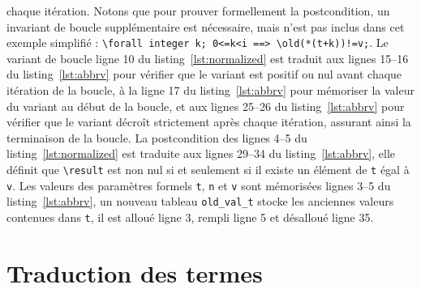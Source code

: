 chaque itération.
Notons que pour prouver formellement la postcondition, un invariant de boucle
supplémentaire est nécessaire, mais n'est pas inclus dans cet exemple simplifié 
: \lstinline|\forall integer k; 0<=k<i ==> \old(*(t+k))!=v;|.
Le variant de boucle ligne 10 du listing~\ref{lst:normalized} est traduit aux
lignes 15--16 du listing~\ref{lst:abbrv} pour vérifier que le variant est
positif ou nul avant chaque itération de la boucle, à la ligne 17 du
listing~\ref{lst:abbrv} pour mémoriser la valeur du variant au début de la
boucle, et aux lignes 25--26 du listing~\ref{lst:abbrv} pour vérifier que le
variant décroît strictement après chaque itération, assurant ainsi la
terminaison de la boucle.
La postcondition des lignes 4--5 du listing~\ref{lst:normalized} est traduite
aux lignes 29--34 du listing~\ref{lst:abbrv}, elle définit que
\lstinline|\result| est non nul si et seulement si il existe un élément de
\lstinline|t| égal à \lstinline|v|.
Les valeurs des paramètres formels \lstinline|t|, \lstinline|n| et \lstinline|v|
sont mémorisées lignes 3--5 du listing~\ref{lst:abbrv}, un nouveau tableau
\lstinline|old_val_t| stocke les anciennes valeurs contenues dans \lstinline|t|,
il est alloué ligne 3, rempli ligne 5 et désalloué ligne 35.


\section{Traduction des termes \eacsl}
\label{sec:term}




